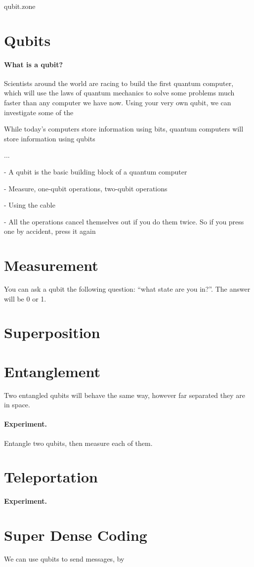 \documentclass[a4paper]{article}
\begin{document}
\begin{center}
\Huge qubit.zone
\end{center}

\section{Qubits}

\paragraph{What is a qubit?}

Scientists around the world are racing to build the first quantum computer, which will use the laws of quantum mechanics to solve some problems much faster than any computer we have now. Using your very own qubit, we can investigate some of the 

While today's computers store information using bits, quantum computers will store information using qubits

...

 - A qubit is the basic building block of a quantum computer
 
 - Measure, one-qubit operations, two-qubit operations
 
 - Using the cable
 
 - All the operations cancel themselves out if you do them twice. So if you press one by accident, press it again
 
 \section{Measurement}
 
You can ask a qubit the following question: ``what state are you in?''. The answer will be 0 or 1.

\section{Superposition}



\section{Entanglement}

Two entangled qubits will behave the same way, however far separated they are in space.

\paragraph{Experiment.} Entangle two qubits, then measure each of them.

\section{Teleportation}

\paragraph{Experiment.} 

\section{Super Dense Coding}

We can use qubits to send messages, by 
\end{document}
